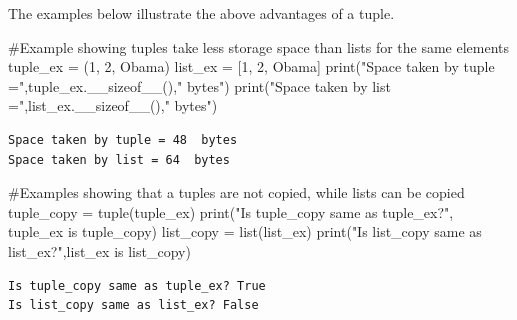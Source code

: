 \documentclass[
  letterpaper,
  DIV=11,
  numbers=noendperiod]{scrreprt}
\newenvironment{Shaded}{\begin{snugshade}}{\end{snugshade}}
\newcommand{\BuiltInTok}[1]{\textcolor[rgb]{0.00,0.23,0.31}{#1}}
\newcommand{\CommentTok}[1]{\textcolor[rgb]{0.37,0.37,0.37}{#1}}
\newcommand{\DecValTok}[1]{\textcolor[rgb]{0.68,0.00,0.00}{#1}}
\newcommand{\KeywordTok}[1]{\textcolor[rgb]{0.00,0.23,0.31}{#1}}
\newcommand{\NormalTok}[1]{\textcolor[rgb]{0.00,0.23,0.31}{#1}}
\newcommand{\OperatorTok}[1]{\textcolor[rgb]{0.37,0.37,0.37}{#1}}
\newcommand{\StringTok}[1]{\textcolor[rgb]{0.13,0.47,0.30}{#1}}
\begin{document}
The examples below illustrate the above advantages of a tuple.

\begin{Shaded}
\begin{Highlighting}[]
\CommentTok{\#Example showing tuples take less storage space than lists for the same elements}
\NormalTok{tuple\_ex }\OperatorTok{=}\NormalTok{ (}\DecValTok{1}\NormalTok{, }\DecValTok{2}\NormalTok{, }\StringTok{\textquotesingle{}Obama\textquotesingle{}}\NormalTok{)}
\NormalTok{list\_ex }\OperatorTok{=}\NormalTok{ [}\DecValTok{1}\NormalTok{, }\DecValTok{2}\NormalTok{, }\StringTok{\textquotesingle{}Obama\textquotesingle{}}\NormalTok{]}
\BuiltInTok{print}\NormalTok{(}\StringTok{"Space taken by tuple ="}\NormalTok{,tuple\_ex.\_\_sizeof\_\_(),}\StringTok{" bytes"}\NormalTok{)}
\BuiltInTok{print}\NormalTok{(}\StringTok{"Space taken by list ="}\NormalTok{,list\_ex.\_\_sizeof\_\_(),}\StringTok{" bytes"}\NormalTok{)}
\end{Highlighting}
\end{Shaded}

\begin{verbatim}
Space taken by tuple = 48  bytes
Space taken by list = 64  bytes
\end{verbatim}

\begin{Shaded}
\begin{Highlighting}[]
\CommentTok{\#Examples showing that a tuples are not copied, while lists can be copied}
\NormalTok{tuple\_copy }\OperatorTok{=} \BuiltInTok{tuple}\NormalTok{(tuple\_ex)}
\BuiltInTok{print}\NormalTok{(}\StringTok{"Is tuple\_copy same as tuple\_ex?"}\NormalTok{, tuple\_ex }\KeywordTok{is}\NormalTok{ tuple\_copy)}
\NormalTok{list\_copy }\OperatorTok{=} \BuiltInTok{list}\NormalTok{(list\_ex)}
\BuiltInTok{print}\NormalTok{(}\StringTok{"Is list\_copy same as list\_ex?"}\NormalTok{,list\_ex }\KeywordTok{is}\NormalTok{ list\_copy)}
\end{Highlighting}
\end{Shaded}

\begin{verbatim}
Is tuple_copy same as tuple_ex? True
Is list_copy same as list_ex? False
\end{verbatim}
\end{document}
